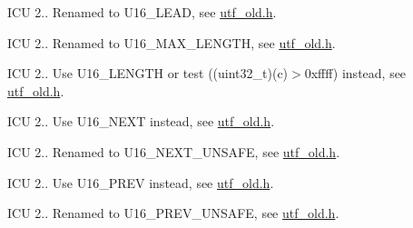 \begin{DoxyRefList}
%
I\+CU 2.. Renamed to U16\+\_\+\+L\+E\+AD, see \mbox{\hyperlink{utf__old_8h}{utf\+\_\+old.\+h}}.  
\item[Member \mbox{\hyperlink{utf__old_8h_abfb4dabb121278e7c2f32dd33a64a9b9}{U\+T\+F16\+\_\+\+M\+A\+X\+\_\+\+C\+H\+A\+R\+\_\+\+L\+E\+N\+G\+TH}} ]\label{deprecated__deprecated000141}%
%
I\+CU 2.. Renamed to U16\+\_\+\+M\+A\+X\+\_\+\+L\+E\+N\+G\+TH, see \mbox{\hyperlink{utf__old_8h}{utf\+\_\+old.\+h}}.  
\item[Member \mbox{\hyperlink{utf__old_8h_ab3a7cdc28e9c0a0b00e43442df70b31e}{U\+T\+F16\+\_\+\+N\+E\+E\+D\+\_\+\+M\+U\+L\+T\+I\+P\+L\+E\+\_\+\+U\+C\+H\+AR}} (c)]\label{deprecated__deprecated000139}%
%
I\+CU 2.. Use U16\+\_\+\+L\+E\+N\+G\+TH or test ((uint32\+\_\+t)(c)$>$0xffff) instead, see \mbox{\hyperlink{utf__old_8h}{utf\+\_\+old.\+h}}.  
\item[Member \mbox{\hyperlink{utf__old_8h_a4761073ea58b177b57cb9bf213c78474}{U\+T\+F16\+\_\+\+N\+E\+X\+T\+\_\+\+C\+H\+A\+R\+\_\+\+S\+A\+FE}} (s, i, length, c, strict)]\label{deprecated__deprecated000150}%
%
I\+CU 2.. Use U16\+\_\+\+N\+E\+XT instead, see \mbox{\hyperlink{utf__old_8h}{utf\+\_\+old.\+h}}.  
\item[Member \mbox{\hyperlink{utf__old_8h_a7721e9811b4a5ed74d57ba9205b5441e}{U\+T\+F16\+\_\+\+N\+E\+X\+T\+\_\+\+C\+H\+A\+R\+\_\+\+U\+N\+S\+A\+FE}} (s, i, c)]\label{deprecated__deprecated000145}%
%
I\+CU 2.. Renamed to U16\+\_\+\+N\+E\+X\+T\+\_\+\+U\+N\+S\+A\+FE, see \mbox{\hyperlink{utf__old_8h}{utf\+\_\+old.\+h}}.  
\item[Member \mbox{\hyperlink{utf__old_8h_ae42ea5d5187aeb4e34bdbdb0f6e2e011}{U\+T\+F16\+\_\+\+P\+R\+E\+V\+\_\+\+C\+H\+A\+R\+\_\+\+S\+A\+FE}} (s, start, i, c, strict)]\label{deprecated__deprecated000159}%
%
I\+CU 2.. Use U16\+\_\+\+P\+R\+EV instead, see \mbox{\hyperlink{utf__old_8h}{utf\+\_\+old.\+h}}.  
\item[Member \mbox{\hyperlink{utf__old_8h_a8ba7c201685c85b26c6d2d72b36e01c9}{U\+T\+F16\+\_\+\+P\+R\+E\+V\+\_\+\+C\+H\+A\+R\+\_\+\+U\+N\+S\+A\+FE}} (s, i, c)]\label{deprecated__deprecated000155}%
%
I\+CU 2.. Renamed to U16\+\_\+\+P\+R\+E\+V\+\_\+\+U\+N\+S\+A\+FE, see \mbox{\hyperlink{utf__old_8h}{utf\+\_\+old.\+h}}.  
\item[Member \mbox{\hyperlink{utf__old_8h_ae65018bde86c5a3e3202fc9c58b56310}{U\+T\+F16\+\_\+\+S\+E\+T\+\_\+\+C\+H\+A\+R\+\_\+\+L\+I\+M\+I\+T\+\_\+\+S\+A\+FE}} (s, start, i, length)]\label{deprecated__deprecated000162}%

\end{DoxyRefList}
